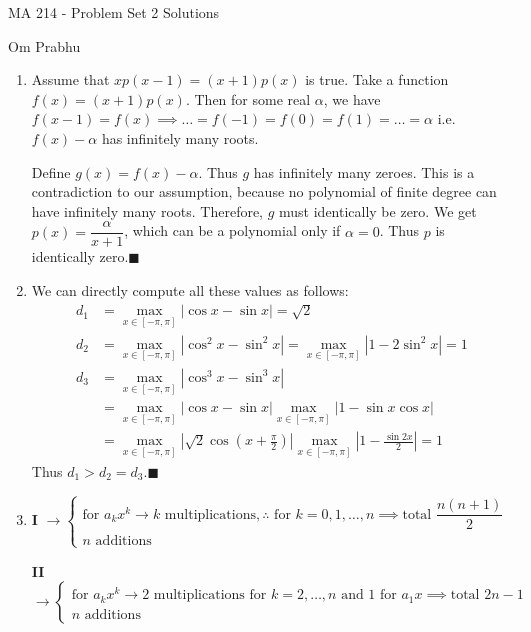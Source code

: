 \documentclass[a4paper, 11pt]{article}
\let\a\alpha
\begin{document}
\begin{center}
	{\LARGE MA 214 - Problem Set 2 Solutions}
	\vspace{2mm}
	
	{\large Om Prabhu}
\end{center}
\begin{enumerate}[label=(\arabic*), leftmargin=*]
	\item Assume that $xp(x-1)=(x+1)p(x)$ is true. Take a function $f(x)=(x+1)p(x)$. Then for some real $\a$, we have $f(x-1)=f(x)\implies \dots=f(-1)=f(0)=f(1)=\dots=\a$ i.e. $f(x)-\a$ has infinitely many roots.
	
	Define $g(x)=f(x)-\a$. Thus $g$ has infinitely many zeroes. This is a contradiction to our assumption, because no polynomial of finite degree can have infinitely many roots. Therefore, $g$ must identically be zero.
	We get $p(x)=\dfrac{\a}{x+1}$, which can be a polynomial only if $\a=0$. Thus $p$ is identically zero.\hfill$\blacksquare$
	\item We can directly compute all these values as follows:
	\begin{align*}
		d_1&=\max_{x\in[-\pi,\pi]}|\cos x-\sin x|=\sqrt{2}\\
		d_2&=\max_{x\in[-\pi,\pi]}|\cos^2 x-\sin^2 x|=\max_{x\in[-\pi,\pi]}|1-2\sin^2 x|=1\\
		d_3&=\max_{x\in[-\pi,\pi]}|\cos^3 x-\sin^3 x|\\
		&=\max_{x\in[-\pi,\pi]}|\cos x-\sin x|\max_{x\in[-\pi,\pi]}|1-\sin x\cos x|\\
		&=\max_{x\in[-\pi,\pi]}|\sqrt{2}\cos\left(x+\frac{\pi}{2}\right)|\max_{x\in[-\pi,\pi]}|1-\frac{\sin 2x}{2}|=1
	\end{align*}
	Thus $d_1>d_2=d_3$.\hfill$\blacksquare$
	\item \textbf{I} $\rightarrow\left\lbrace\begin{array}{l}
		\text{for }a_kx^k\rightarrow k\text{ multiplications},\text{}\therefore\text{ for }k=0,1,\dots,n\implies\text{total }\dfrac{n(n+1)}{2}\text{}	\\
		n\text{ additions}
	\end{array}
	\right.$
	
	\textbf{II} $\rightarrow\left\lbrace\begin{array}{l}
		\text{for }a_kx^k\rightarrow\text{2 multiplications for }k=2,\dots,n\text{ and 1 for }a_1x\implies\text{total }2n-1\text{}	\\
		n\text{ additions}
	\end{array}
	\right.$
	

\end{enumerate}
\end{document}
